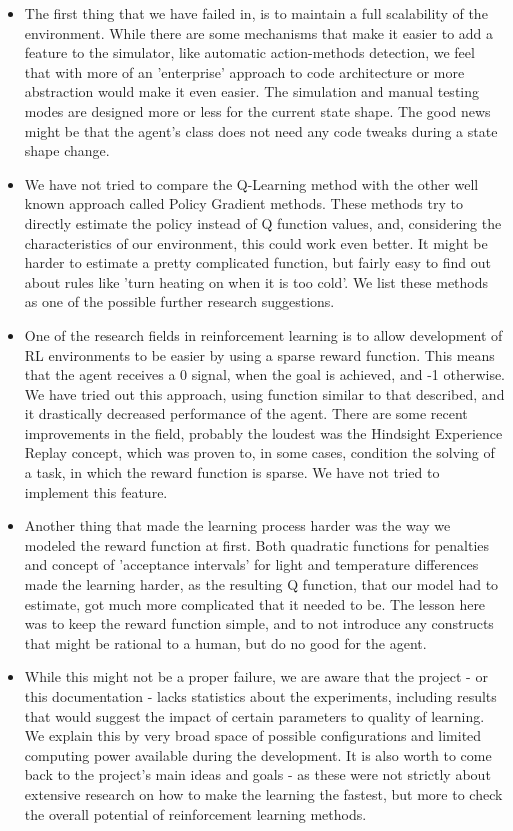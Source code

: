 \documentclass{article}
\begin{document}
\begin{itemize}
\item The first thing that we have failed in, is to maintain a full scalability of the environment. While there are some mechanisms that make it easier to add a feature to the simulator, like automatic action-methods detection, we feel that with more of an 'enterprise' approach to code architecture or more abstraction would make it even easier. The simulation and manual testing modes are designed more or less for the current state shape. The good news might be that the agent's class does not need any code tweaks during a state shape change.

\item We have not tried to compare the Q-Learning method with the other well known approach called Policy Gradient methods. These methods try to directly estimate the policy instead of Q function values, and, considering the characteristics of our environment, this could work even better. It might be harder to estimate a pretty complicated function, but fairly easy to find out about rules like 'turn heating on when it is too cold'. We list these methods as one of the possible further research suggestions.

\item One of the research fields in reinforcement learning is to allow development of RL environments to be easier by using a sparse reward function. This means that the agent receives a 0 signal, when the goal is achieved, and -1 otherwise. We have tried out this approach, using function similar to that described, and it drastically decreased performance of the agent. There are some recent improvements in the field, probably the loudest was the Hindsight Experience Replay concept, which was proven to, in some cases, condition the solving of a task, in which the reward function is sparse. We have not tried to implement this feature.

\item Another thing that made the learning process harder was the way we modeled the reward function at first. Both quadratic functions for penalties and concept of 'acceptance intervals' for light and temperature differences made the learning harder, as the resulting Q function, that our model had to estimate, got much more complicated that it needed to be. The lesson here was to keep the reward function simple, and to not introduce any constructs that might be rational to a human, but do no good for the agent. 

\item While this might not be a proper failure, we are aware that the project - or this documentation - lacks statistics about the experiments, including results that would suggest the impact of certain parameters to quality of learning. We explain this by very broad space of possible configurations and limited computing power available during the development. It is also worth to come back to the project's main ideas and goals - as these were not strictly about extensive research on how to make the learning the fastest, but more to check the overall potential of reinforcement learning methods. 
\end{itemize}
\end{document}
